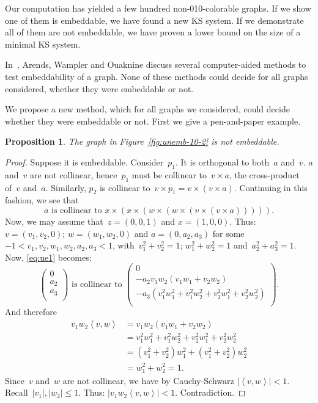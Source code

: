 \documentclass[a4paper]{article}
\newcounter{main}
\newtheorem{prop}[main]{Proposition}
\theoremstyle{definition}
\theoremstyle{remark}
\begin{document}
Our computation has yielded a few hundred non-010-colorable graphs.
If we show one of them is embeddable, we have found a new KS system.
If we demonstrate all of them are not embeddable, we have
proven a lower bound on the size of a minimal KS system.

In~\cite{aow11}, Arends, Wampler and Ouaknine discuss several
computer-aided methods
to test embeddability of a graph.  None of these methods could decide
for all graphs considered, whether they were embeddable or not.

We propose a new method,
which for all graphs we considered,
could decide
whether they were embeddable or not.
First we give a pen-and-paper example.
\begin{prop}\label{prop:unemb-10-2}
The graph in Figure~\ref{fig:unemb-10-2}
is not embeddable.
\end{prop}
\begin{proof}
Suppose it is embeddable.
Consider~$p_1$.
It is orthogonal to both~$a$ and~$v$.
$a$ and~$v$ are not collinear,
hence~$p_1$ must be collinear to~$v \times a$,
the cross-product of~$v$ and~$a$.
Similarly, $p_2$ is collinear to~$v \times p_1 = v \times (v \times a)$.
Continuing in this fashion,
we see that
\begin{equation}\label{eq:ue1}
    a \text{ is collinear to }
    x \times (x \times( w \times (w\times (v \times (v \times a))))).
\end{equation}
Now, we may assume that~$z=(0,0,1)$ and $x=(1,0,0)$.
Thus: $v=(v_1,v_2,0)$;
$w = (w_1,w_2,0)$
and $a = (0, a_2,a_3)$ for some~$-1 < v_1,v_2,w_1,w_2,a_2,a_3 < 1$,
with~$v_1^2+v_2^2 = 1$; $w_1^2+w_2^2=1$ and~$a_2^2 + a_3^2=1$.
Now, \eqref{eq:ue1} becomes:
\begin{equation*}
\begin{pmatrix}
0\\
a_2\\
a_3\\
\end{pmatrix}
\text{ is collinear to }
\begin{pmatrix}
0\\
-a_2 v_1w_2 (v_1w_1 + v_2w_2) \\
-a_3 (v_1^2 w_1^2 + v_1^2 w_2^2 + v_2^2w_1^2 + v_2^2w_2^2)\\
\end{pmatrix}.
\end{equation*}
And therefore
\begin{align*}
v_1w_2 \left<v,w\right> & =
v_1w_2 (v_1w_1 + v_2w_2) \\
& = v_1^2 w_1^2 + v_1^2 w_2^2 + v_2^2w_1^2 + v_2^2w_2^2 \\
& = (v_1^2 + v_2^2)w_1^2 + (v_1^2 + v_2^2)w_2^2 \\
& = w_1^2 + w_2^2 = 1.
\end{align*}
Since~$v$ and~$w$ are not collinear,
we have by Cauchy-Schwarz $|\left<v,w\right>| < 1$.
Recall~$|v_1|, |w_2| \leq 1$.
Thus: $|v_1w_2\left<v,w\right>| < 1$.
Contradiction.
\end{proof}
\end{document}

